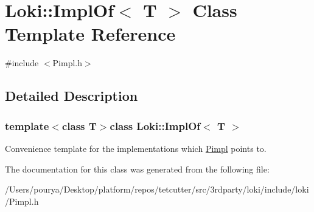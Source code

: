 \hypertarget{structLoki_1_1ImplOf}{}\section{Loki\+:\+:Impl\+Of$<$ T $>$ Class Template Reference}
\label{structLoki_1_1ImplOf}


{\ttfamily \#include $<$Pimpl.\+h$>$}



\subsection{Detailed Description}
\subsubsection*{template$<$class T$>$class Loki\+::\+Impl\+Of$<$ T $>$}

Convenience template for the implementations which \hyperlink{classLoki_1_1Pimpl}{Pimpl} points to. 

The documentation for this class was generated from the following file\+:\begin{DoxyCompactItemize}
\item 
/\+Users/pourya/\+Desktop/platform/repos/tetcutter/src/3rdparty/loki/include/loki/Pimpl.\+h\end{DoxyCompactItemize}
